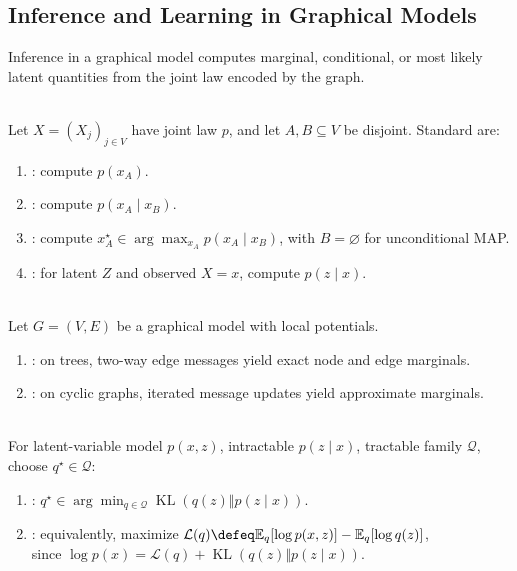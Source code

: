 \subsection{Inference and Learning in Graphical Models}

Inference in a graphical model computes marginal, conditional, or most likely latent quantities from the joint law encoded by the graph.

\begin{definition} \label{def:sl-graphical-model-inference-tasks} \\
Let $X=(X_j)_{j\in V}$ have joint law $p$, and let $A,B\subseteq V$ be disjoint. Standard  are:
\begin{enumerate}[label=(\roman*)]
\setlength{\itemsep}{0pt}
\item {}: compute $p(x_A)$.
\item {}: compute $p(x_A\mid x_B)$.
\item {}: compute $x_A^\star\in\arg\max_{x_A}p(x_A\mid x_B)$, with $B=\varnothing$ for unconditional MAP.
\item {}: for latent $Z$ and observed $X=x$, compute $p(z\mid x)$.
\end{enumerate}
\end{definition}

\begin{method} \label{method:sl-message-passing} \\
Let $G=(V,E)$ be a graphical model with local potentials.
\begin{enumerate}[label=(\roman*)]
\setlength{\itemsep}{0pt}
\item {}: on trees, two-way edge messages yield exact node and edge marginals.
\item {}: on cyclic graphs, iterated message updates yield approximate marginals.
\end{enumerate}
\end{method}

\begin{definition} \label{def:sl-variational-inference} \\
For latent-variable model $p(x,z)$, intractable $p(z\mid x)$, tractable family $\mathcal{Q}$,  choose $q^\star\in\mathcal{Q}$:
\begin{enumerate}[label=(\roman*)]
\setlength{\itemsep}{0pt}
\item {}: $q^\star\in\arg\min_{q\in\mathcal{Q}}\operatorname{KL}(q(z)\Vert p(z\mid x))$.
\item {}: equivalently, maximize $\mathcal{L}(q)\defeq\mathbb{E}_q[\log p(x,z)]-\mathbb{E}_q[\log q(z)]$,\\
since $\log p(x)=\mathcal{L}(q)+\operatorname{KL}(q(z)\Vert p(z\mid x))$.
\end{enumerate}
\end{definition}

